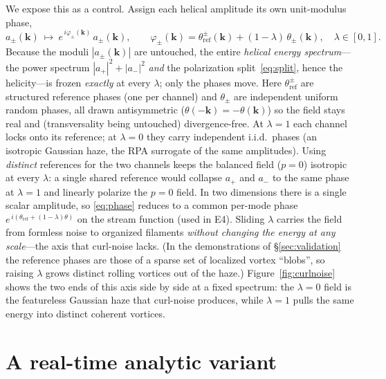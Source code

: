 \documentclass[11pt]{article}
\theoremstyle{remark}
\newcommand{\bk}{\mathbf{k}}
\begin{document}
We expose this as a control. Assign each helical amplitude its own unit-modulus phase,
\begin{equation}
a_\pm(\bk)\ \longmapsto\ e^{\,i\varphi_\pm(\bk)}\,a_\pm(\bk),
\qquad
\varphi_\pm(\bk)=\theta_{\mathrm{ref}}^{\pm}(\bk)+(1-\lambda)\,\theta_\pm(\bk),
\quad \lambda\in[0,1].
\label{eq:phase}
\end{equation}
Because the moduli $|a_\pm(\bk)|$ are untouched, the entire \emph{helical energy spectrum}---the
power spectrum $|a_+|^2+|a_-|^2$ \emph{and} the polarization split~\eqref{eq:split}, hence the
helicity---is frozen \emph{exactly} at every $\lambda$; only the phases move. Here
$\theta_{\mathrm{ref}}^{\pm}$ are structured reference phases (one per channel) and
$\theta_\pm$ are independent uniform random phases, all drawn antisymmetric
($\theta(-\bk)=-\theta(\bk)$) so the field stays real and (transversality being untouched)
divergence-free. At $\lambda=1$ each channel locks onto its reference; at $\lambda=0$ they carry
independent i.i.d.\ phases (an isotropic Gaussian haze, the RPA surrogate of the same
amplitudes). Using \emph{distinct} references for the two channels keeps the balanced field
($p=0$) isotropic at every $\lambda$: a single shared reference would collapse
$a_+$ and $a_-$ to the same phase at $\lambda=1$ and linearly polarize the $p=0$ field. In two
dimensions there is a single scalar amplitude, so \eqref{eq:phase} reduces to a common per-mode
phase $e^{\,i(\theta_{\mathrm{ref}}+(1-\lambda)\theta)}$ on the stream function (used in E4). Sliding
$\lambda$ carries the field from formless noise to organized filaments \emph{without changing
the energy at any scale}---the axis that curl-noise lacks. (In the demonstrations of \S\ref{sec:validation} the reference
phases are those of a sparse set of localized vortex ``blobs'', so raising $\lambda$ grows
distinct rolling vortices out of the haze.) Figure~\ref{fig:curlnoise} shows the two ends of
this axis side by side at a fixed spectrum: the $\lambda=0$ field is the featureless Gaussian
haze that curl-noise produces, while $\lambda=1$ pulls the same energy into distinct coherent
vortices.

\FloatBarrier
\section{A real-time analytic variant}
\label{sec:modesum}
\end{document}
